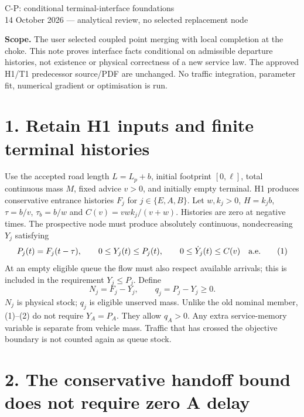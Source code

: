 \documentclass[11pt,a4paper]{article}
\begin{document}
\begin{center}
{\Large C-P: conditional terminal-interface foundations}\\[4pt]
14 October 2026 --- analytical review, no selected replacement node
\end{center}

\textbf{Scope.} The user selected coupled point merging with local completion
at the choke. This note proves interface facts conditional on admissible
departure histories, not existence or physical correctness of a new service
law. The approved H1/T1 predecessor source/PDF are unchanged. No traffic
integration, parameter fit, numerical gradient or optimisation is run.

\section*{1. Retain H1 inputs and finite terminal histories}

Use the accepted road length $L=L_p+b$, initial footprint $[0,\ell]$,
total continuous mass $M$, fixed advice $v>0$, and initially empty terminal.
H1 produces conservative entrance histories $F_j$ for $j\in\{E,A,B\}$.
Let $w,k_j>0$, $H=k_jb$, $\tau=b/v$, $\tau_b=b/w$ and
$C(v)=vwk_j/(v+w)$. Histories are zero at negative times. The prospective
node must produce absolutely continuous, nondecreasing $Y_j$ satisfying
\begin{equation}
 P_j(t)=F_j(t-\tau),\qquad
 0\leq Y_j(t)\leq P_j(t),\qquad
 0\leq \dot Y_j(t)\leq C(v)
 \quad\hbox{a.e.}
 \tag{1}
\end{equation}
At an empty eligible queue the flow must also respect available arrivals;
this is included in the requirement $Y_j\leq P_j$. Define
\begin{equation}
 N_j=F_j-Y_j,\qquad q_j=P_j-Y_j\geq0.
 \tag{2}
\end{equation}
$N_j$ is physical stock; $q_j$ is eligible unserved mass. Unlike the old
nominal member, (1)--(2) do not require $Y_A=P_A$. They allow $q_A>0$.
Any extra service-memory variable is separate from vehicle mass. Traffic
that has crossed the objective boundary is not counted again as queue stock.

\section*{2. The conservative handoff bound does not require zero A delay}
\end{document}
